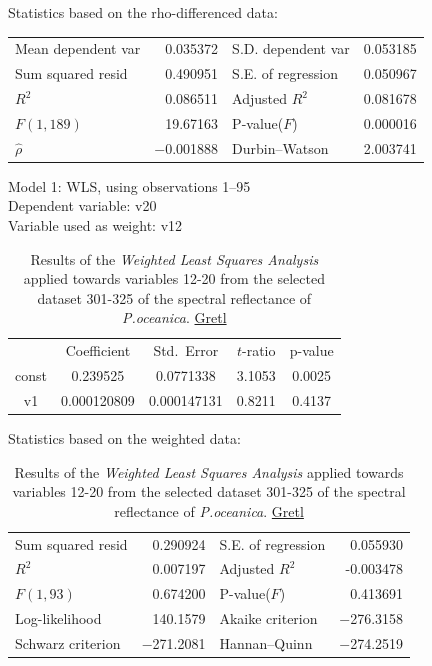 \documentclass[10pt, a4paper]{article}
\begin{document}
\begin{appendices}
\begin{table}[H]
\begin{center}
	\vspace{1em}Statistics based on the rho-differenced data:

	\vspace{1ex}
	\begin{tabular}{lrlr}
		Mean dependent var &  0.035372 & S.D. dependent var &  0.053185 \\
		Sum squared resid &  0.490951 & S.E. of regression &  0.050967 \\
		$R^2$ &  0.086511 & Adjusted $R^2$ &  0.081678 \\
		$F(1, 189)$ &  19.67163 & P-value($F$) &  0.000016 \\
		$\hat{\rho}$ & $-$0.001888 & Durbin--Watson &  2.003741 \\
	\end{tabular}
	\end{center}
\end{table}

\begin{table}[H]
	\begin{center}
	\caption{Results of the \textit{Weighted Least Squares Analysis} applied towards variables 12-20 from the selected dataset 301-325 of the spectral reflectance of \textit{P.oceanica}. \href{http://gretl.sourceforge.net/}{Gretl}}
		Model 1: WLS, using observations 1--95\\
		Dependent variable: v20\\
		Variable used as weight: v12

	\vspace{1em}
	\begin{tabular}{|c|c|c|c|c|}
		  & {Coefficient} & {Std.\ Error} & {$t$-ratio} & {p-value} \\[1ex]
		const &   0.239525 &     0.0771338 & 3.1053 &         0.0025 \\
		v1 &   0.000120809 &     0.000147131 &       0.8211 &         0.4137 \\
	\end{tabular}

	\vspace{1em}Statistics based on the weighted data:

	\vspace{1ex}
	\begin{tabular}{lrlr}
		Sum squared resid &  0.290924 & S.E. of regression &  0.055930 \\
		$R^2$ &  0.007197 & Adjusted $R^2$ & -0.003478 \\
		$F(1, 93)$ &  0.674200 & P-value($F$) &  0.413691 \\
		Log-likelihood &  140.1579 & Akaike criterion & $-$276.3158 \\
		Schwarz criterion & $-$271.2081 & Hannan--Quinn & $-$274.2519 \\
	\end{tabular}


\end{center}
\end{table}
\end{appendices}
\end{document}
